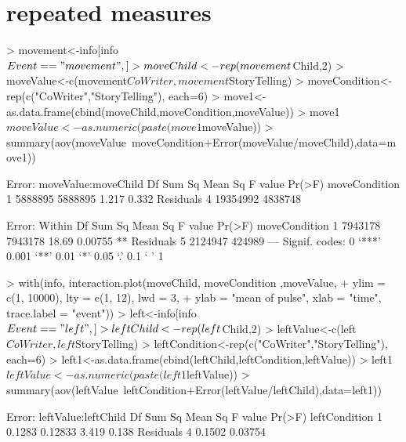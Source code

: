 \documentclass{article}
\begin{document}
\section{repeated measures}
\begin{Schunk}
\begin{Sinput}
> movement<-info[info$Event=="movement",]
> moveChild<-rep(movement$Child,2)
> moveValue<-c(movement$CoWriter,movement$StoryTelling)
> moveCondition<-rep(c("CoWriter","StoryTelling"), each=6)
> move1<-as.data.frame(cbind(moveChild,moveCondition,moveValue))
> move1$moveValue<-as.numeric(paste(move1$moveValue))
> summary(aov(moveValue~moveCondition+Error(moveValue/moveChild),data=move1))
\end{Sinput}
\begin{Soutput}
Error: moveValue:moveChild
              Df   Sum Sq Mean Sq F value Pr(>F)
moveCondition  1  5888895 5888895   1.217  0.332
Residuals      4 19354992 4838748               

Error: Within
              Df  Sum Sq Mean Sq F value  Pr(>F)   
moveCondition  1 7943178 7943178   18.69 0.00755 **
Residuals      5 2124947  424989                   
---
Signif. codes:  0 ‘***’ 0.001 ‘**’ 0.01 ‘*’ 0.05 ‘.’ 0.1 ‘ ’ 1
\end{Soutput}
\begin{Sinput}
> with(info, interaction.plot(moveChild, moveCondition ,moveValue,
+   ylim = c(1, 10000), lty = c(1, 12), lwd = 3,
+   ylab = "mean of pulse", xlab = "time", trace.label = "event"))
> left<-info[info$Event=="left",]
> leftChild<-rep(left$Child,2)
> leftValue<-c(left$CoWriter,left$StoryTelling)
> leftCondition<-rep(c("CoWriter","StoryTelling"), each=6)
> left1<-as.data.frame(cbind(leftChild,leftCondition,leftValue))
> left1$leftValue<-as.numeric(paste(left1$leftValue))
> summary(aov(leftValue~leftCondition+Error(leftValue/leftChild),data=left1))
\end{Sinput}
\begin{Soutput}
Error: leftValue:leftChild
              Df Sum Sq Mean Sq F value Pr(>F)
leftCondition  1 0.1283 0.12833   3.419  0.138
Residuals      4 0.1502 0.03754               


\end{Soutput}
\end{Schunk}
\end{document}
